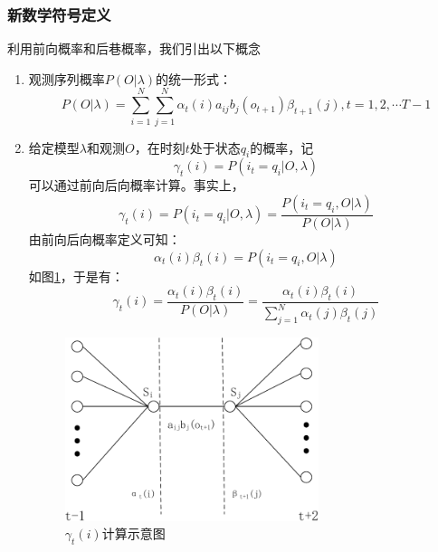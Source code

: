         \subsubsection{新数学符号定义}
        利用前向概率和后巷概率，我们引出以下概念
        \begin{enumerate}
            \item 观测序列概率$P(O|\lambda )$的统一形式：
                \begin{equation}
                    P(O|\lambda ) = \sum\limits_{i = 1}^N {\sum\limits_{j = 1}^N {{\alpha _t}(i)} {a_{ij}}{b_j}({o_{t + 1}}){\beta _{t + 1}}\left( j \right),} t = 1,2, \cdots T - 1
                \end{equation}
            \item 给定模型$\lambda $和观测$O$，在时刻$t$处于状态$q_i$的概率，记
                \begin{equation}
                    {\gamma _t}(i) = P({i_t} = {q_i}|O,\lambda )
                \end{equation}
                可以通过前向后向概率计算。事实上，
                \[{\gamma _t}(i) = P({i_t} = {q_i}|O,\lambda ) = \frac{{P({i_t} = {q_i},O|\lambda )}}{{P(O|\lambda )}}\]
                由前向后向概率定义可知：
                \[{\alpha _t}(i){\beta _t}(i) = P({i_t} = {q_i},O|\lambda )\]
                如图\ref{fig:gamma}，于是有：
                \begin{equation}\label{equation:gamma}
                {\gamma _t}(i) = \frac{{{\alpha _t}(i){\beta _t}(i)}}{{P(O|\lambda )}} = \frac{{{\alpha _t}(i){\beta _t}(i)}}{{\sum\limits_{j = 1}^N {{\alpha _t}(j){\beta _t}(j)} }}
                \end{equation}

                \begin{figure}
                \centering
                \includegraphics[width=0.7\textwidth]{figures/chapter2/gamma-crop}
                \caption{${\gamma _t}(i)$计算示意图}
                \label{fig:gamma}
                \end{figure}


\end{enumerate}
